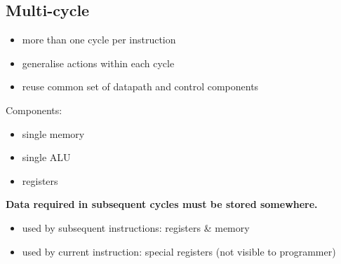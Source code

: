 \documentclass{article}
\begin{document}
\subsection{Multi-cycle}
\begin{itemize}
	\item more than one cycle per instruction
	\item generalise actions within each cycle
	\item reuse common set of datapath and control components
\end{itemize}
Components:
\begin{itemize}
	\item single memory
	\item single ALU
	\item registers
\end{itemize}
\textbf{Data required in subsequent cycles must be stored somewhere.}
\begin{itemize}
	\item used by subsequent instructions: registers \& memory
	\item used by current instruction: special registers (not visible to programmer) 
\end{itemize}
\end{document}
